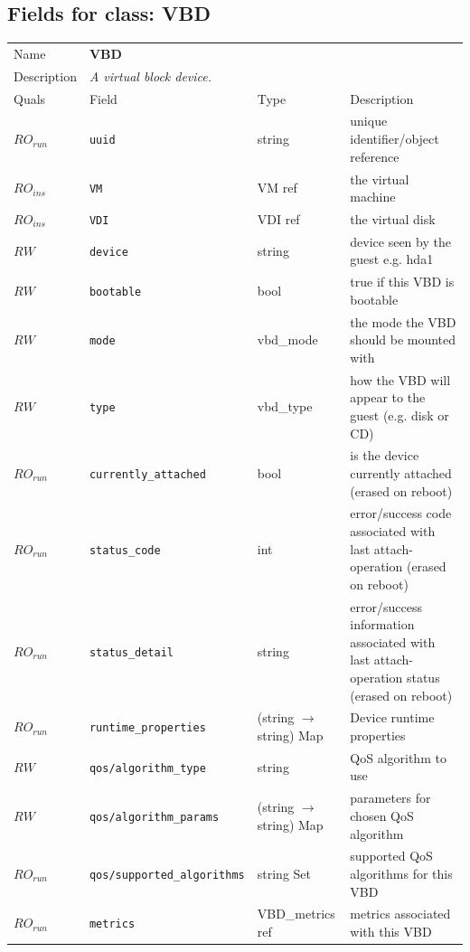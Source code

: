 \subsection{Fields for class: VBD}
\begin{longtable}{|lllp{}|}
\hline
\multicolumn{1}{|l}{Name} & \multicolumn{3}{l|}{\bf VBD} \\
\multicolumn{1}{|l}{Description} & \multicolumn{3}{l|}{\parbox{11cm}{\em A
virtual block device.}} \\
\hline
Quals & Field & Type & Description \\
\hline
$\mathit{RO}_\mathit{run}$ &  {\tt uuid} & string & unique identifier/object reference \\
$\mathit{RO}_\mathit{ins}$ &  {\tt VM} & VM ref & the virtual machine \\
$\mathit{RO}_\mathit{ins}$ &  {\tt VDI} & VDI ref & the virtual disk \\
$\mathit{RW}$ &  {\tt device} & string & device seen by the guest e.g. hda1 \\
$\mathit{RW}$ &  {\tt bootable} & bool & true if this VBD is bootable \\
$\mathit{RW}$ &  {\tt mode} & vbd\_mode & the mode the VBD should be mounted with \\
$\mathit{RW}$ &  {\tt type} & vbd\_type & how the VBD will appear to the guest (e.g. disk or CD) \\
$\mathit{RO}_\mathit{run}$ &  {\tt currently\_attached} & bool & is the device currently attached (erased on reboot) \\
$\mathit{RO}_\mathit{run}$ &  {\tt status\_code} & int & error/success code associated with last attach-operation (erased on reboot) \\
$\mathit{RO}_\mathit{run}$ &  {\tt status\_detail} & string & error/success information associated with last attach-operation status (erased on reboot) \\
$\mathit{RO}_\mathit{run}$ &  {\tt runtime\_properties} & (string $\rightarrow$ string) Map & Device runtime properties \\
$\mathit{RW}$ &  {\tt qos/algorithm\_type} & string & QoS algorithm to use \\
$\mathit{RW}$ &  {\tt qos/algorithm\_params} & (string $\rightarrow$ string) Map & parameters for chosen QoS algorithm \\
$\mathit{RO}_\mathit{run}$ &  {\tt qos/supported\_algorithms} & string Set & supported QoS algorithms for this VBD \\
$\mathit{RO}_\mathit{run}$ &  {\tt metrics} & VBD\_metrics ref & metrics associated with this VBD \\
\hline
\end{longtable}
